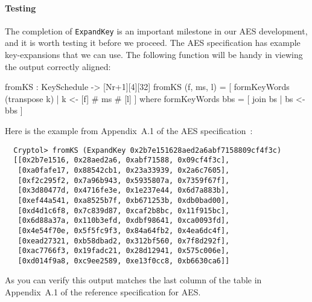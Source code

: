 \paragraph*{Testing {}} The completion of
{\tt ExpandKey} is an important milestone in our AES\indAES
development, and it is worth testing it before we proceed. The AES
specification has example key-expansions that we can use. The
following function will be handy in viewing the output correctly
aligned:
\begin{code}
  fromKS : KeySchedule -> [Nr+1][4][32]
  fromKS (f, ms, l) = [ formKeyWords (transpose k) 
                      | k <- [f] # ms # [l] 
                      ]
         where formKeyWords bbs = [ join bs | bs <- bbs ]
\end{code}
Here is the example from Appendix~A.1 of the AES\indAES
specification~\cite{aes}:
\begin{Verbatim}
  Cryptol> fromKS (ExpandKey 0x2b7e151628aed2a6abf7158809cf4f3c)
  [[0x2b7e1516, 0x28aed2a6, 0xabf71588, 0x09cf4f3c],
   [0xa0fafe17, 0x88542cb1, 0x23a33939, 0x2a6c7605],
   [0xf2c295f2, 0x7a96b943, 0x5935807a, 0x7359f67f],
   [0x3d80477d, 0x4716fe3e, 0x1e237e44, 0x6d7a883b],
   [0xef44a541, 0xa8525b7f, 0xb671253b, 0xdb0bad00],
   [0xd4d1c6f8, 0x7c839d87, 0xcaf2b8bc, 0x11f915bc],
   [0x6d88a37a, 0x110b3efd, 0xdbf98641, 0xca0093fd],
   [0x4e54f70e, 0x5f5fc9f3, 0x84a64fb2, 0x4ea6dc4f],
   [0xead27321, 0xb58dbad2, 0x312bf560, 0x7f8d292f],
   [0xac7766f3, 0x19fadc21, 0x28d12941, 0x575c006e],
   [0xd014f9a8, 0xc9ee2589, 0xe13f0cc8, 0xb6630ca6]]
\end{Verbatim}
As you can verify this output matches the last column of the table in
Appendix~A.1 of the reference specification for AES.\indAES

